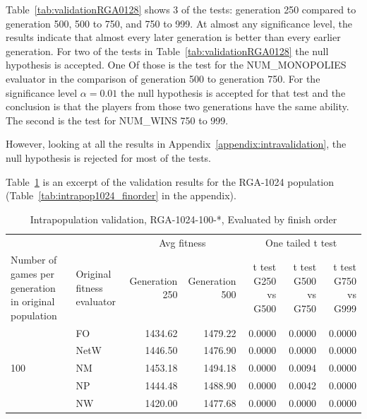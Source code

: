 Table~\ref{tab:validationRGA0128} shows 3 of the tests: generation 250 compared
to generation 500, 500 to 750, and 750 to 999. At almost any significance level,
the results indicate that almost every later generation is better than every
earlier generation. For two of the tests in Table~\ref{tab:validationRGA0128}
the null hypothesis is accepted. One Of those is the test for the
NUM\_MONOPOLIES evaluator in the comparison of generation 500 to generation 750.
For the significance level \(\alpha=0.01\) the null hypothesis is accepted for
that test and the conclusion is that the players from those two generations have
the same ability. The second is the test for NUM\_WINS 750 to 999.

However, looking at all the results in Appendix~\ref{appendix:intravalidation}, 
the null hypothesis is rejected for most of the tests.

Table~\ref{tab:validationRGA1024} is an excerpt of the validation results
for the RGA-1024 population (Table~\ref{tab:intrapop1024_finorder} in the
appendix).

\begin{table}[ht]
  \centering
  \caption{Intrapopulation validation, RGA-1024-100-*, Evaluated by finish order}
    \begin{tabularx}{\linewidth}{|p{1in}|p{1in}|r|r|r|r|r|}
    \cline{3-7}
    \multicolumn{1}{l}{} &  & \multicolumn{2}{c|}{Avg fitness} & \multicolumn{3}{c|}{One tailed t test} \\
    \cline{1-7}
    Number of games per generation in original population
    & Original fitness evaluator
    & \multicolumn{1}{p{0.7in}|}{Generation 250}
    & \multicolumn{1}{p{0.7in}|}{Generation 500}
    & \multicolumn{1}{X|}{t test G250 vs G500}
    & \multicolumn{1}{X|}{t test G500 vs G750}
    & \multicolumn{1}{X|}{t test G750 vs G999} \\
    \cline{1-7}
      \multirow{5}{*}{100} 
      & FO & 1434.62 & 1479.22 & 0.0000 & 0.0000 & 0.0000 \\
\cline{2-7}             
      & NetW & 1446.50 & 1476.90 & 0.0000 & 0.0000 & 0.0000 \\
\cline{2-7}     
      & NM & 1453.18 & 1494.18 & 0.0000 & 0.0094 & 0.0000 \\
\cline{2-7}    
      & NP & 1444.48 & 1488.90 & 0.0000 & 0.0042 & 0.0000 \\
\cline{2-7}   
      & NW & 1420.00 & 1477.68 & 0.0000 & 0.0000 & 0.0000 \\
      \cline{1-7}
    \end{tabularx}%
  \label{tab:validationRGA1024}%
\end{table}%

